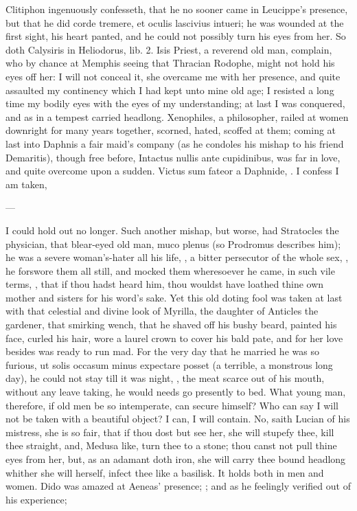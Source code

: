 Clitiphon ingenuously confesseth, that he no sooner came in
Leucippe's presence, but that he did corde tremere, et oculis lascivius
intueri; he was wounded at the first sight, his heart panted, and
he could not possibly turn his eyes from her. So doth Calysiris in
Heliodorus, lib. 2. Isis Priest, a reverend old man, complain, who by
chance at Memphis seeing that Thracian Rodophe, might not hold his eyes
off her: I will not conceal it, she overcame me with her
presence, and quite assaulted my continency which I had kept unto mine
old age; I resisted a long time my bodily eyes with the eyes of my
understanding; at last I was conquered, and as in a tempest carried
headlong.  Xenophiles, a philosopher, railed at women downright
for many years together, scorned, hated, scoffed at them; coming at
last into Daphnis a fair maid's company (as he condoles his mishap to
his friend Demaritis), though free before, Intactus nullis ante
cupidinibus, was far in love, and quite overcome upon a sudden. Victus
sum fateor a Daphnide, \etc{}. I confess I am taken,

---

I could hold out no longer. Such another mishap, but worse, had
Stratocles the physician, that blear-eyed old man, muco plenus (so
Prodromus describes him); he was a severe woman's-hater all his
life, , a bitter
persecutor of the whole sex, , he
forswore them all still, and mocked them wheresoever he came, in such
vile terms, , that if thou hadst heard him,
thou wouldst have loathed thine own mother and sisters for his word's
sake. Yet this old doting fool was taken at last with that celestial
and divine look of Myrilla, the daughter of Anticles the gardener, that
smirking wench, that he shaved off his bushy beard, painted his face,
curled his hair, wore a laurel crown to cover his bald pate, and
for her love besides was ready to run mad. For the very day that he
married he was so furious, ut solis occasum minus expectare posset (a
terrible, a monstrous long day), he could not stay till it was night,
, the meat scarce
out of his mouth, without any leave taking, he would needs go presently
to bed. What young man, therefore, if old men be so intemperate, can
secure himself? Who can say I will not be taken with a beautiful
object? I can, I will contain. No, saith Lucian of his mistress,
she is so fair, that if thou dost but see her, she will stupefy thee,
kill thee straight, and, Medusa like, turn thee to a stone; thou canst
not pull thine eyes from her, but, as an adamant doth iron, she will
carry thee bound headlong whither she will herself, infect thee like a
basilisk. It holds both in men and women. Dido was amazed at Aeneas'
presence; ; and as he feelingly
verified out of his experience;

